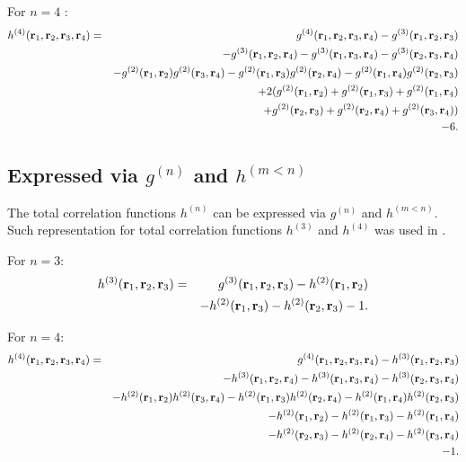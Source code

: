 For $n=4$ :
\begin{eqnarray}
h^{(4)}(\vb{r}_1, \vb{r}_2, \vb{r}_3, \vb{r}_4) &=& g^{(4)}(\vb{r}_1, \vb{r}_2, \vb{r}_3, \vb{r}_4) - g^{(3)}(\vb{r}_1, \vb{r}_2, \vb{r}_3) 
\nonumber\\
&&-g^{(3)}(\vb{r}_1, \vb{r}_2, \vb{r}_4) -  g^{(3)}(\vb{r}_1, \vb{r}_3, \vb{r}_4) - g^{(3)}(\vb{r}_2, \vb{r}_3, \vb{r}_4) 
\nonumber\\
&&-g^{(2)}(\vb{r}_1,\vb{r}_2) g^{(2)}(\vb{r}_3,\vb{r}_4) - g^{(2)}(\vb{r}_1,\vb{r}_3) g^{(2)}(\vb{r}_2,\vb{r}_4) - g^{(2)}(\vb{r}_1,\vb{r}_4)g^{(2)}(\vb{r}_2,\vb{r}_3)
\nonumber\\
&&+2(g^{(2)}(\vb{r}_1,\vb{r}_2) + g^{(2)}(\vb{r}_1,\vb{r}_3) + g^{(2)}(\vb{r}_1,\vb{r}_4)
\nonumber\\
&&+g^{(2)}(\vb{r}_2,\vb{r}_3) + g^{(2)}(\vb{r}_2,\vb{r}_4) + g^{(2)}(\vb{r}_3,\vb{r}_4)) 
\nonumber\\
&&-6.
\end{eqnarray}

\subsection{Expressed via $g^{(n)}$ and $h^{(m<n)}$}
The total correlation functions $h^{(n)}$ can be expressed via $g^{(n)}$ and $h^{(m<n)}$.
Such representation for total correlation functions $h^{(3)}$ and $h^{(4)}$ was used in \cite{attardJCP1990}.

For $n=3$:
\begin{eqnarray}
h^{(3)}(\vb{r}_1 ,\vb{r}_2, \vb{r}_3) &=& g^{(3)}(\vb{r}_1, \vb{r}_2, \vb{r}_3) - h^{(2)}(\vb{r}_1, \vb{r}_2) 
\nonumber\\
&&-h^{(2)}(\vb{r}_1,\vb{r}_3) -  h^{(2)}(\vb{r}_2,\vb{r}_3) -1.
\end{eqnarray}

For $n=4$:
\begin{eqnarray}
h^{(4)}(\vb{r}_1, \vb{r}_2, \vb{r}_3, \vb{r}_4) &=& g^{(4)}(\vb{r}_1, \vb{r}_2, \vb{r}_3, \vb{r}_4) - h^{(3)}(\vb{r}_1, \vb{r}_2, \vb{r}_3) 
\nonumber\\
&&-h^{(3)}(\vb{r}_1, \vb{r}_2, \vb{r}_4) -  h^{(3)}(\vb{r}_1, \vb{r}_3, \vb{r}_4) - h^{(3)}(\vb{r}_2, \vb{r}_3, \vb{r}_4) 
\nonumber\\
&&-h^{(2)}(\vb{r}_1,\vb{r}_2) h^{(2)}(\vb{r}_3,\vb{r}_4) - h^{(2)}(\vb{r}_1,\vb{r}_3) h^{(2)}(\vb{r}_2,\vb{r}_4) - h^{(2)}(\vb{r}_1,\vb{r}_4)h^{(2)}(\vb{r}_2,\vb{r}_3)
\nonumber\\
&&-h^{(2)}(\vb{r}_1,\vb{r}_2) - h^{(2)}(\vb{r}_1,\vb{r}_3) - h^{(2)}(\vb{r}_1,\vb{r}_4)
\nonumber\\
&&-h^{(2)}(\vb{r}_2,\vb{r}_3) - h^{(2)}(\vb{r}_2,\vb{r}_4) - h^{(2)}(\vb{r}_3,\vb{r}_4) 
\nonumber\\
&&-1.
\end{eqnarray}

